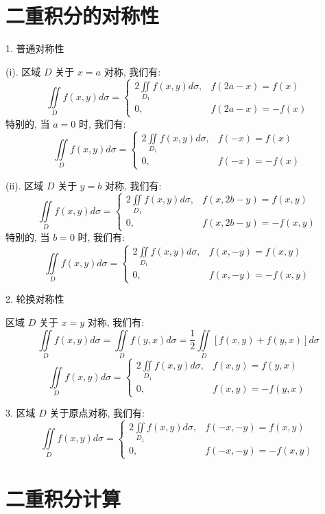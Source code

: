 \section{二重积分的对称性}

\begin{theorem}[对称性]
	1. 普通对称性

	(i). 区域 $D$ 关于 $x = a$ 对称, 我们有:
	$$\iint\limits_{D} f(x,y)d\sigma = \begin{cases} 2\iint\limits_{D_{1}} f(x,y)d\sigma, & f(2a-x) = f(x) \\ 0, & f(2a-x) = -f(x)  \end{cases}$$
	特别的, 当 $a = 0$ 时, 我们有:
	$$\iint\limits_{D} f(x,y)d\sigma = \begin{cases} 2\iint\limits_{D_{1}} f(x,y)d\sigma, & f(-x) = f(x) \\ 0, & f(-x) = -f(x)  \end{cases}$$

	(ii). 区域 $D$ 关于 $y = b$ 对称, 我们有:
	$$\iint\limits_{D} f(x,y)d\sigma = \begin{cases} 2\iint\limits_{D_{1}} f(x,y)d\sigma, & f(x,2b-y) = f(x,y) \\ 0, & f(x,2b-y) = -f(x,y)  \end{cases}$$
	特别的, 当 $b = 0$ 时, 我们有:
	$$\iint\limits_{D} f(x,y)d\sigma = \begin{cases} 2\iint\limits_{D_{1}} f(x,y)d\sigma, & f(x,-y) = f(x,y) \\ 0, & f(x,-y) = -f(x,y)  \end{cases}$$

	2. 轮换对称性

	区域 $D$ 关于 $x = y$ 对称, 我们有:
	$$\iint\limits_{D} f(x,y)d\sigma = \iint\limits_{D} f(y,x)d\sigma= \dfrac{1}{2}\iint\limits_{D}\left[f(x,y)+f(y,x)\right]d\sigma$$
	$$\iint\limits_{D} f(x,y)d\sigma = \begin{cases} 2\iint\limits_{D_{1}} f(x,y)d\sigma, & f(x,y) = f(y,x) \\ 0, & f(x,y) = -f(y,x)  \end{cases}$$

	3. 区域 $D$ 关于原点对称, 我们有:
	$$\iint\limits_{D} f(x,y)d\sigma = \begin{cases} 2\iint\limits_{D_{1}} f(x,y)d\sigma, & f(-x,-y) = f(x,y) \\ 0, & f(-x,-y) = -f(x,y)  \end{cases}$$
\end{theorem}
\section{二重积分计算}

